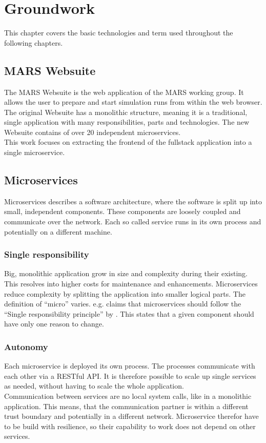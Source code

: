 
\chapter{Groundwork}
This chapter covers the basic technologies and term used throughout the following chapters.



\section{MARS Websuite}
The MARS Websuite is the web application of the MARS working group. It allows the user to prepare and start simulation runs from within the web browser.\\
The original Websuite has a monolithic structure, meaning it is a traditional, single application with many responsibilities, parts and technologies. The new Websuite contains of over 20 independent microservices.\\
This work focuses on extracting the frontend of the fullstack application into a single microservice.


\section{Microservices}
\label{sec:microservices}
Microservices describes a software architecture, where the software is split up into small, independent components. These components are loosely coupled and communicate over the network. Each so called service runs in its own process and potentially on a different machine.


\subsection{Single responsibility}
Big, monolithic application grow in size and complexity during their existing. This resolves into higher costs for maintenance and enhancements. Microservices reduce complexity by splitting the application into smaller logical parts. The definition of \enquote{micro} varies. \cite{newman2015building} e.g. claims that microservices should follow the \enquote{Single responsibility principle} by \cite{martin2003agile}. This states that a given component should have only one reason to change.


\subsection{Autonomy}
Each microservice is deployed its own process. The processes communicate with each other via a RESTful API. It is therefore possible to scale up single services as needed, without having to scale the whole application.\\
Communication between services are no local system calls, like in a monolithic application. This means, that the communication partner is within a different trust boundary and potentially in a different network. Microservice therefor have to be build with resilience, so their capability to work does not depend on other services.


